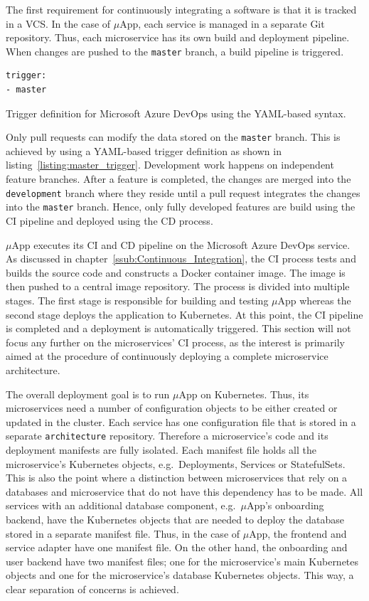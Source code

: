The first requirement for continuously integrating a software is that it is
tracked in a \ac{VCS}. In the case of $\mu$App, each service is managed in a
separate Git repository. Thus, each microservice has its own build and
deployment pipeline. When changes are pushed to the \texttt{master} branch, a
build pipeline is triggered.

\begin{listing}[H]
  \begin{verbatim}
trigger:
- master
  \end{verbatim}
  \caption{Trigger definition for Microsoft Azure DevOps using the YAML-based syntax.}%
  \label{listing:master_trigger}
\end{listing}

Only pull requests can modify the data stored on the \texttt{master} branch.
This is achieved by using a YAML-based trigger definition as shown in
listing~\ref{listing:master_trigger}. Development work happens on independent
feature branches. After a feature is completed, the changes are merged into the
\texttt{development} branch where they reside until a pull request integrates
the changes into the \texttt{master} branch. Hence, only fully developed
features are build using the \ac{CI} pipeline and deployed using the \ac{CD}
process.

$\mu$App executes its \ac{CI} and \ac{CD} pipeline on the Microsoft Azure
DevOps service. As discussed in chapter~\ref{ssub:Continuous_Integration}, the
\ac{CI} process tests and builds the source code and constructs a Docker
container image. The image is then pushed to a central image repository. The
process is divided into multiple stages. The first stage is responsible for
building and testing $\mu$App whereas the second stage deploys the application
to Kubernetes. At this point, the \ac{CI} pipeline is completed and a
deployment is automatically triggered. This section will not focus any further
on the microservices' \ac{CI} process, as the interest is primarily aimed at
the procedure of continuously deploying a complete microservice architecture.

The overall deployment goal is to run $\mu$App on Kubernetes. Thus, its
microservices need a number of configuration objects to be either created or
updated in the cluster. Each service has one configuration file that is stored
in a separate \texttt{architecture} repository. Therefore a microservice's code
and its deployment manifests are fully isolated. Each manifest file holds all
the microservice's Kubernetes objects, e.g.\ Deployments, Services or
StatefulSets.  This is also the point where a distinction between microservices
that rely on a databases and microservice that do not have this dependency has
to be made. All services with an additional database component, e.g.\
$\mu$App's onboarding backend, have the Kubernetes objects that are needed to
deploy the database stored in a separate manifest file. Thus, in the case of
$\mu$App, the frontend and service adapter have one manifest file. On the other
hand, the onboarding and user backend have two manifest files; one for the
microservice's main Kubernetes objects and one for the microservice's database
Kubernetes objects.  This way, a clear separation of concerns is achieved.

